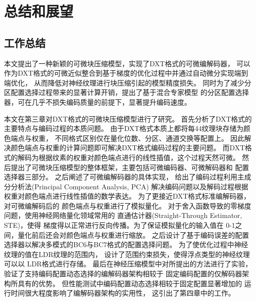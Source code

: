 
\chapter{总结和展望}

\section{工作总结}

本文提出了一种新颖的可微块压缩模型，实现了DXT格式的可微编解码器，
可以作为DXT格式的可微近似整合到基于梯度的优化过程中并通过自动微分实现端到端优化，
从而降低对神经纹理进行块压缩引起的模型精度损失。
同时为了减少分区配置选择过程带来的显著计算开销，提出了基于混合专家模型
的分区配置选择器，可在几乎不损失编码质量的前提下，显著提升编码速度。

本文在第三章对DXT格式的可微块压缩模型进行了研究。
首先分析了DXT格式的主要特点与编码过程的本质问题。
由于DXT格式本质上都将每4\times4纹理块存储为颜色端点与权重，
不同格式区别仅在量化位数、分区、通道交换等配置上。
因此解决颜色端点与权重的计算问题即可解决DXT格式编码过程的主要问题。
而DXT格式的解码为根据纹素的权重对颜色端点进行的线性插值，这个过程天然可微。
然后提出了可微块压缩模型的整体框架，主要包括可微编码器、可微解码器和
配置选择器三部分。
之后阐述了可微编解码器的具体实现，
给出了编码过程利用主成分分析法(Principal Component Analysis, PCA)
解决编码问题以及解码过程根据权重对颜色端点进行线性插值的数学表达。
为了更接近DXT格式标准编解码器，对可微编解码后的
颜色端点与权重进行了模拟量化。
对于舍入函数导致的零梯度问题，使用神经网络量化领域常用的
直通估计器(Straight-Through Estimator, STE)，使得
梯度得以正常进行反向传播。为了保证模拟量化的输入值在
0-1之间，量化前后还会对颜色端点与权重进行缩放。
之后设计了基于编码误差的配置选择器以解决多模式的BC6与BC7格式的配置选择问题。
为了使优化过程中神经纹理的值在LDR纹理的范围内，
设计了范围约束损失，使得浮点类型的神经纹理可以以
LDR格式进行存储。
最后在神经压缩模型中对所提出的方法进行了实验，
验证了支持编码配置动态选择的编解码器架构相较于
固定编码配置的仅解码器架构所具有的优势。
但性能测试中编码配置动态选择相较于固定配置显著增加的
运行时间很大程度影响了编解码器架构的实用性，
这引出了第四章中的工作。

